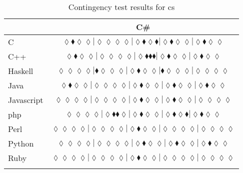 \begin{table*}
\centering
\begin{tabular}{l c}
& C\# \\
\hline

C & $\scriptscriptstyle\lozenge\blacklozenge\lozenge\lozenge|\lozenge\lozenge\lozenge\lozenge|\lozenge\blacklozenge\lozenge\blacklozenge|\lozenge\blacklozenge\lozenge\lozenge|\lozenge\blacklozenge\lozenge\lozenge$ \\
C++ & $\scriptscriptstyle\lozenge\blacklozenge\lozenge\lozenge|\lozenge\lozenge\lozenge\lozenge|\lozenge\blacklozenge\blacklozenge\blacklozenge|\lozenge\blacklozenge\lozenge\lozenge|\lozenge\blacklozenge\lozenge\lozenge$ \\
Haskell & $\scriptscriptstyle\lozenge\lozenge\lozenge\lozenge|\blacklozenge\lozenge\lozenge\lozenge|\lozenge\blacklozenge\lozenge\lozenge|\blacklozenge\lozenge\lozenge\lozenge|\lozenge\lozenge\lozenge\lozenge$ \\
Java & $\scriptscriptstyle\lozenge\blacklozenge\lozenge\lozenge|\lozenge\lozenge\lozenge\lozenge|\lozenge\blacklozenge\lozenge\lozenge|\lozenge\blacklozenge\lozenge\lozenge|\lozenge\blacklozenge\lozenge\lozenge$ \\
Javascript & $\scriptscriptstyle\lozenge\lozenge\lozenge\lozenge|\lozenge\lozenge\lozenge\lozenge|\lozenge\blacklozenge\lozenge\lozenge|\lozenge\blacklozenge\lozenge\lozenge|\lozenge\lozenge\lozenge\lozenge$ \\
{\sc php} & $\scriptscriptstyle\lozenge\lozenge\lozenge\lozenge|\lozenge\blacklozenge\blacklozenge\lozenge|\lozenge\blacklozenge\lozenge\lozenge|\lozenge\blacklozenge\lozenge\blacklozenge|\lozenge\blacklozenge\lozenge\lozenge$ \\
Perl & $\scriptscriptstyle\lozenge\lozenge\lozenge\lozenge|\lozenge\lozenge\lozenge\lozenge|\lozenge\blacklozenge\lozenge\lozenge|\lozenge\lozenge\lozenge\lozenge|\lozenge\lozenge\lozenge\lozenge$ \\
Python & $\scriptscriptstyle\lozenge\lozenge\lozenge\lozenge|\lozenge\lozenge\lozenge\lozenge|\lozenge\blacklozenge\lozenge\lozenge|\lozenge\blacklozenge\lozenge\lozenge|\lozenge\blacklozenge\lozenge\lozenge$ \\
Ruby & $\scriptscriptstyle\lozenge\lozenge\lozenge\lozenge|\lozenge\lozenge\lozenge\lozenge|\lozenge\blacklozenge\lozenge\lozenge|\lozenge\lozenge\lozenge\lozenge|\lozenge\lozenge\lozenge\lozenge$ \\

\hline
& \\
\end{tabular}
\caption{Contingency test results for cs}
\label{tbl:contingency-test-results-cs}
\end{table*}


